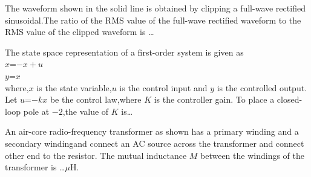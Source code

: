     \item The waveform shown in the solid line is obtained by clipping a full-wave rectified sinusoidal.The ratio of the RMS value of the full-wave rectified waveform to the RMS value of the clipped waveform is \dots\\

    \item The state space representation of a first-order system is given as \\
    $x$=$-x+u$\\
    $y$=$x$\\
    where,$x$ is the state variable,$u$ is the control input and $y$ is the controlled output. Let $u$=$-kx$ be the control law,where $K$ is the controller gain. To place a closed-loop pole at $-2$,the value of $K$ is\dots
    \item An air-core radio-frequency transformer as shown has a primary winding and a secondary windingand connect an AC source across the transformer and connect other end to the resistor. The mutual inductance $M$ between the windings of the transformer is \dots $\mu$H.\\
 
